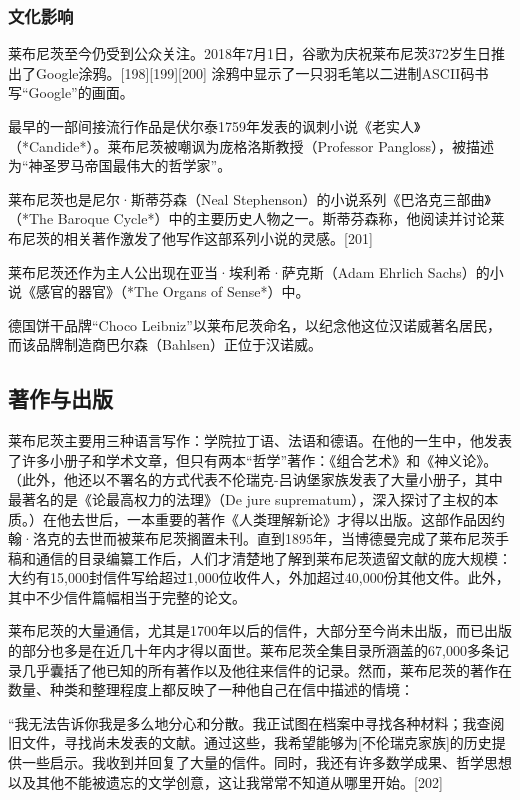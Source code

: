 \subsubsection{文化影响}
莱布尼茨至今仍受到公众关注。2018年7月1日，谷歌为庆祝莱布尼茨372岁生日推出了Google涂鸦。[198][199][200] 涂鸦中显示了一只羽毛笔以二进制ASCII码书写“Google”的画面。

最早的一部间接流行作品是伏尔泰1759年发表的讽刺小说《老实人》（*Candide*）。莱布尼茨被嘲讽为庞格洛斯教授（Professor Pangloss），被描述为“神圣罗马帝国最伟大的哲学家”。

莱布尼茨也是尼尔·斯蒂芬森（Neal Stephenson）的小说系列《巴洛克三部曲》（*The Baroque Cycle*）中的主要历史人物之一。斯蒂芬森称，他阅读并讨论莱布尼茨的相关著作激发了他写作这部系列小说的灵感。[201]

莱布尼茨还作为主人公出现在亚当·埃利希·萨克斯（Adam Ehrlich Sachs）的小说《感官的器官》（*The Organs of Sense*）中。

德国饼干品牌“Choco Leibniz”以莱布尼茨命名，以纪念他这位汉诺威著名居民，而该品牌制造商巴尔森（Bahlsen）正位于汉诺威。
\subsection{著作与出版}
莱布尼茨主要用三种语言写作：学院拉丁语、法语和德语。在他的一生中，他发表了许多小册子和学术文章，但只有两本“哲学”著作：《组合艺术》和《神义论》。 （此外，他还以不署名的方式代表不伦瑞克-吕讷堡家族发表了大量小册子，其中最著名的是《论最高权力的法理》（De jure suprematum），深入探讨了主权的本质。）在他去世后，一本重要的著作《人类理解新论》才得以出版。这部作品因约翰·洛克的去世而被莱布尼茨搁置未刊。直到1895年，当博德曼完成了莱布尼茨手稿和通信的目录编纂工作后，人们才清楚地了解到莱布尼茨遗留文献的庞大规模：大约有15,000封信件写给超过1,000位收件人，外加超过40,000份其他文件。此外，其中不少信件篇幅相当于完整的论文。

莱布尼茨的大量通信，尤其是1700年以后的信件，大部分至今尚未出版，而已出版的部分也多是在近几十年内才得以面世。莱布尼茨全集目录所涵盖的67,000多条记录几乎囊括了他已知的所有著作以及他往来信件的记录。然而，莱布尼茨的著作在数量、种类和整理程度上都反映了一种他自己在信中描述的情境：

“我无法告诉你我是多么地分心和分散。我正试图在档案中寻找各种材料；我查阅旧文件，寻找尚未发表的文献。通过这些，我希望能够为[不伦瑞克家族]的历史提供一些启示。我收到并回复了大量的信件。同时，我还有许多数学成果、哲学思想以及其他不能被遗忘的文学创意，这让我常常不知道从哪里开始。[202]


